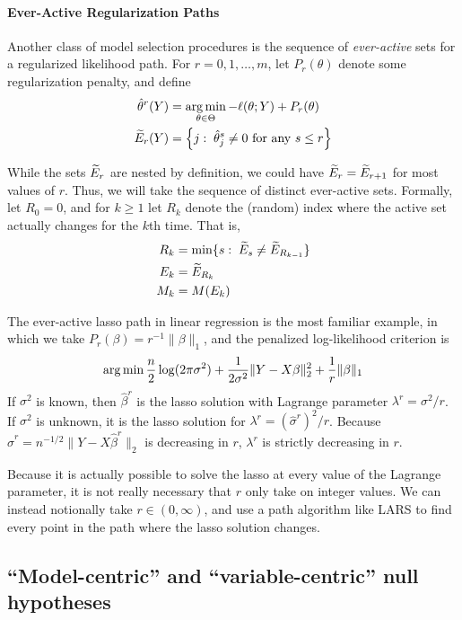 \documentclass{article}
\begin{document}
\paragraph{Ever-Active Regularization Paths}
Another class of model selection procedures is the sequence of {\em ever-active} sets for a regularized likelihood path. For $r=0,1,\ldots,m$, let $P_r(\theta)$ denote some regularization penalty, and define
\begin{align}\label{eq:regPathDef_start}
  \hat\theta^{r}(Y) &= 
  \operatorname*{arg\,min}_{\theta\in\Theta} -\ell(\theta; Y) + P_r(\theta) \\
  \widetilde{E}_r(Y) &= \left\{j:\; \hat\theta_j^s \neq 0 
    \text{ for any } s \leq r \right\}
\end{align}

While the sets $\widetilde{E}_r$ are nested by definition, we could have $\widetilde{E}_r = \widetilde{E}_{r+1}$ for most values of $r$. Thus, we will take the sequence of distinct ever-active sets. Formally, let $R_0=0$, and for $k\geq 1$ let $R_k$ denote the (random) index where the active set actually changes for the $k$th time. That is,
\begin{align}
  R_k &= \min\{s:\; \widetilde{E}_s \neq \widetilde{E}_{R_{k-1}}\}\\
  E_k &= \widetilde{E}_{R_k}\\
  \label{eq:regPathDef_end}
  M_k &= M(E_k)
\end{align}

The ever-active lasso path in linear regression is the most familiar example, in which we take $P_r(\beta) = r^{-1}\|\beta\|_1$, and the penalized log-likelihood criterion is
\begin{equation}
  \operatorname*{arg\,min} \frac{n}{2}\log(2\pi\sigma^2) 
  + \frac{1}{2\sigma^2}\|Y - X\beta\|_2^2 + \frac{1}{r}\|\beta\|_1
\end{equation}
If $\sigma^2$ is known, then $\hat\beta^{r}$ is the lasso solution with Lagrange parameter $\lambda^r = \sigma^{2}/r$. If $\sigma^2$ is unknown, it is the lasso solution for $\lambda^r = (\hat\sigma^r)^2/r$. Because $\hat\sigma^r = n^{-1/2}\|Y-X\hat\beta^r\|_2$ is decreasing in $r$, $\lambda^r$ is strictly decreasing in $r$.

Because it is actually possible to solve the lasso at every value of the Lagrange parameter, it is not really necessary that $r$ only take on integer values. We can instead notionally take $r\in (0,\infty)$, and use a path algorithm like LARS \citep{taylor2014exact} to find every point in the path where the lasso solution changes.

\subsection{``Model-centric'' and ``variable-centric'' null hypotheses}
\label{sec:whichnull}
\end{document}
